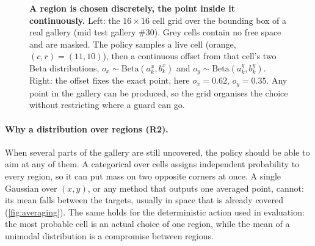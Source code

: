 \documentclass[11pt,a4paper]{article}
\begin{document}
\begin{figure}[!htbp]
\caption{\textbf{A region is chosen discretely, the point inside it continuously.} Left: the
$16\times16$ cell grid over the bounding box of a real gallery (mid test gallery \#30). Grey
cells contain no free space and are masked. The policy samples a live cell (orange, $(c,r)=(11,10)$),
then a continuous offset from that cell's two Beta distributions,
$o_x\sim\mathrm{Beta}(a^x_k,b^x_k)$ and $o_y\sim\mathrm{Beta}(a^y_k,b^y_k)$. Right: the offset fixes
the exact point, here $o_x=0.62$, $o_y=0.35$. Any point in the gallery can be produced, so the
grid organises the choice without restricting where a guard can go.}
\label{fig:action}
\end{figure}

\paragraph{Why a distribution over regions (R2).}
When several parts of the gallery are still uncovered, the policy should be able to aim at
any of them. A categorical over cells assigns independent probability to every region, so it
can put mass on two opposite corners at once. A single Gaussian over $(x,y)$, or any method
that outputs one averaged point, cannot: its mean falls between the targets, usually in space
that is already covered (\cref{fig:averaging}). The same holds for the deterministic action
used in evaluation: the most probable cell is an actual choice of one region, while the mean
of a unimodal distribution is a compromise between regions.
\end{document}
